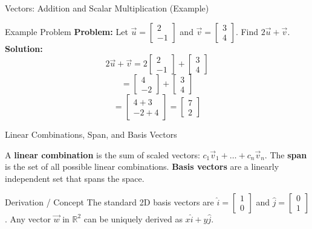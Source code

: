 \documentclass[10pt, aspectratio=169]{beamer}
\begin{document}
\begin{frame}{Vectors: Addition and Scalar Multiplication (Example)}
    \begin{exampleblock}{Example Problem}
        \textbf{Problem:} Let $\vec{u} = \begin{bmatrix} 2 \\ -1 \end{bmatrix}$ and $\vec{v} = \begin{bmatrix} 3 \\ 4 \end{bmatrix}$. Find $2\vec{u} + \vec{v}$. \\
        \vspace{0.5cm}
        \textbf{Solution:} 
        $$2\vec{u} + \vec{v} = 2\begin{bmatrix} 2 \\ -1 \end{bmatrix} + \begin{bmatrix} 3 \\ 4 \end{bmatrix}$$
        $$= \begin{bmatrix} 4 \\ -2 \end{bmatrix} + \begin{bmatrix} 3 \\ 4 \end{bmatrix}$$
        $$= \begin{bmatrix} 4 + 3 \\ -2 + 4 \end{bmatrix} = \begin{bmatrix} 7 \\ 2 \end{bmatrix}$$
    \end{exampleblock}
\end{frame}

\begin{frame}{Linear Combinations, Span, and Basis Vectors}
    \begin{definition}
        A \textbf{linear combination} is the sum of scaled vectors: $c_1\vec{v}_1 + \dots + c_n\vec{v}_n$. The \textbf{span} is the set of all possible linear combinations. \textbf{Basis vectors} are a linearly independent set that spans the space.
    \end{definition}

    \begin{block}{Derivation / Concept}
        The standard 2D basis vectors are $\hat{i} = \begin{bmatrix} 1 \\ 0 \end{bmatrix}$ and $\hat{j} = \begin{bmatrix} 0 \\ 1 \end{bmatrix}$. Any vector $\vec{w}$ in $\mathbb{R}^2$ can be uniquely derived as $x\hat{i} + y\hat{j}$.
    \end{block}
\end{frame}
\end{document}
